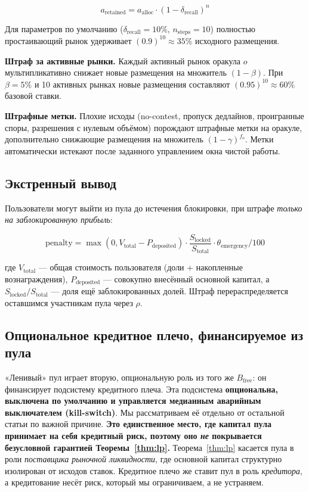 \documentclass{ledger}
\theoremstyle{plain}
\theoremstyle{remark}
\begin{document}
\[
a_{\text{retained}} = a_{\text{alloc}} \cdot (1 - \delta_{\text{recall}})^n
\]

Для параметров по умолчанию ($\delta_{\text{recall}} = 10\%$, $n_{\text{steps}} =
10$) полностью простаивающий рынок удерживает $(0.9)^{10} \approx 35\%$ исходного
размещения.

\textbf{Штраф за активные рынки.} Каждый активный рынок оракула $o$
мультипликативно снижает новые размещения на множитель $(1 - \beta)$. При $\beta =
5\%$ и 10 активных рынках новые размещения составляют $(0.95)^{10} \approx 60\%$
базовой ставки.

\textbf{Штрафные метки.} Плохие исходы (no-contest, пропуск дедлайнов, проигранные
споры, разрешения с нулевым объёмом) порождают штрафные метки на оракуле,
дополнительно снижающие размещения на множитель $(1 - \gamma)^{f_o}$. Метки
автоматически истекают после заданного управлением окна чистой работы.

\subsection{Экстренный вывод}

Пользователи могут выйти из пула до истечения блокировки, при штрафе \emph{только
на заблокированную прибыль}:

\[
\text{penalty} = \max(0, V_{\text{total}} - P_{\text{deposited}}) \cdot
\frac{S_{\text{locked}}}{S_{\text{total}}} \cdot \theta_{\text{emergency}} / 100
\]

где $V_{\text{total}}$ --- общая стоимость пользователя (доли + накопленные
вознаграждения), $P_{\text{deposited}}$ --- совокупно внесённый основной капитал, а
$S_{\text{locked}} / S_{\text{total}}$ --- доля ещё заблокированных долей. Штраф
перераспределяется оставшимся участникам пула через $\rho$.

\subsection{Опциональное кредитное плечо, финансируемое из пула}\label{sec:leverage}

«Ленивый» пул играет вторую, опциональную роль из того же $B_{\text{free}}$: он
финансирует подсистему кредитного плеча. Эта подсистема \textbf{опциональна,
выключена по умолчанию и управляется медианным аварийным выключателем
(kill-switch)}. Мы рассматриваем её отдельно от остальной статьи по важной причине.
\textbf{Это единственное место, где капитал пула принимает на себя кредитный риск,
поэтому оно \emph{не} покрывается безусловной гарантией Теоремы~\ref{thm:lp}.}
Теорема~\ref{thm:lp} касается пула в роли \emph{поставщика рыночной ликвидности},
где основной капитал структурно изолирован от исходов ставок. Кредитное плечо же
ставит пул в роль \emph{кредитора}, а кредитование несёт риск, который мы
ограничиваем, а не устраняем.
\end{document}
